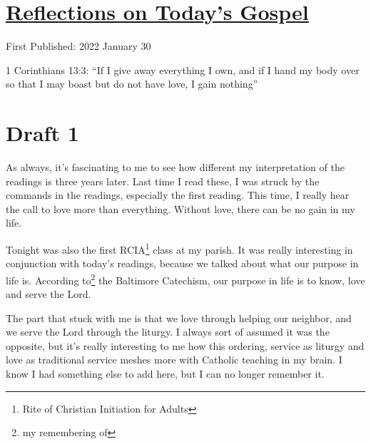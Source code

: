 \documentclass[12pt]{article}[titlepage]
\newcommand{\say}[1]{``#1''}
\renewcommand{\,}{\textsuperscript{,}}
\begin{document}
\doublespacing
\section{\href{reflections-on-readings-4-ordinary-c-2022.html}{Reflections on Today's Gospel}}
First Published: 2022 January 30

1 Corinthians 13:3: \say{If I give away everything I own, and if I hand my body over so that I may boast but do not have love, I gain nothing}

\section{Draft 1}
As always, it's fascinating to me to see how different my interpretation of the readings is three years later.
Last time I read these, I was struck by the commands in the readings, especially the first reading.
This time, I really hear the call to love more than everything.
Without love, there can be no gain in my life.

Tonight was also the first RCIA\footnote{Rite of Christian Initiation for Adults} class at my parish.
It was really interesting in conjunction with today's readings, because we talked about what our purpose in life is.
According to\footnote{my remembering of} the Baltimore Catechism, our purpose in life is to know, love and serve the Lord.

The part that stuck with me is that we love through helping our neighbor, and we serve the Lord through the liturgy.
I always sort of assumed it was the opposite, but it's really interesting to me how this ordering, service as liturgy and love as traditional service meshes more with Catholic teaching in my brain.
I know I had something else to add here, but I can no longer remember it.
\end{document}

